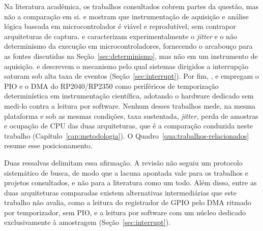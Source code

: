 Na literatura acadêmica, os trabalhos consultados cobrem partes da questão, mas
não a comparação em si.  e 
mostram que instrumentação de aquisição e análise lógica baseada em
microcontrolador é viável e reprodutível, sem contrapor arquiteturas de
captura.  e  caracterizam
experimentalmente o \emph{jitter} e o não determinismo da execução em
microcontroladores, fornecendo o arcabouço para as fontes discutidas na
Seção~\ref{sec:determinismo}, mas não em um instrumento de aquisição.
 e  descrevem o mecanismo pelo
qual sistemas dirigidos a interrupção saturam sob alta taxa de eventos
(Seção~\ref{sec:interrupt}). Por fim, ,
 e  empregam o \ac{PIO} e o
\ac{DMA} do RP2040/RP2350 como periféricos de temporização determinística em
instrumentação científica, adotando o hardware dedicado sem medi-lo contra a
leitura por software. Nenhum desses trabalhos mede, na mesma plataforma e sob
as mesmas condições, taxa sustentada, \emph{jitter}, perda de amostras e
ocupação de \ac{CPU} das duas arquiteturas, que é a comparação conduzida neste
trabalho (Capítulo~\ref{cap:metodologia}). O
Quadro~\ref{qua:trabalhos-relacionados} resume esse posicionamento.

Duas ressalvas delimitam essa afirmação. A revisão não seguiu um protocolo
sistemático de busca, de modo que a lacuna apontada vale para os trabalhos e
projetos consultados, e não para a literatura como um todo. Além disso, entre
as duas arquiteturas comparadas existem alternativas intermediárias que este
trabalho não avalia, como a leitura do registrador de \ac{GPIO} pelo
\ac{DMA} ritmado por temporizador, sem \ac{PIO}, e a leitura por software com
um núcleo dedicado exclusivamente à amostragem
(Seção~\ref{sec:interrupt}).

